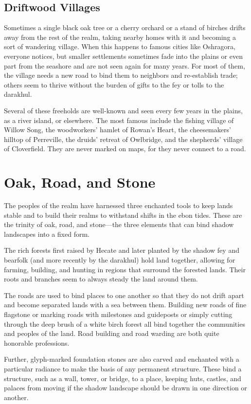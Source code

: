 \documentclass[10pt,a4paper,twoside,bg=print,twocolumn,openany,nodeprecatedcode]{dndbook}
\begin{document}
\subsection{Driftwood Villages}
Sometimes a single black oak tree or a cherry orchard or a stand of birches drifts away from the rest of the realm, taking nearby homes with it and becoming a sort of wandering village. When this happens to famous cities like Oshragora, everyone notices, but smaller settlements sometimes fade into the plains or even part from the seashore and are not seen again for many years. For most of them, the village needs a new road to bind them to neighbors and re-establish trade; others seem to thrive without the burden of gifts to the fey or tolls to the darakhul.

Several of these freeholds are well-known and seen every few years in the plains, as a river island, or elsewhere. The most famous include the fishing village of Willow Song, the woodworkers' hamlet of Rowan's Heart, the cheesemakers' hilltop of Perreville, the druids' retreat of Owlbridge, and the shepherds' village of Cloverfield. They are never marked on maps, for they never connect to a road.

\section{Oak, Road, and Stone}
The peoples of the realm have harnessed three enchanted tools to keep lands stable and to build their realms to withstand shifts in the ebon tides. These are the trinity of oak, road, and stone—the three elements that can bind shadow landscapes into a fixed form.

The rich forests first raised by Hecate and later planted by the shadow fey and bearfolk (and more recently by the darakhul) hold land together, allowing for farming, building, and hunting in regions that surround the forested lands. Their roots and branches seem to always steady the land around them.

The roads are used to bind places to one another so that they do not drift apart and become separated lands with a sea between them. Building new roads of fine flagstone or marking roads with milestones and guideposts or simply cutting through the deep brush of a white birch forest all bind together the communities and peoples of the land. Road building and road warding are both quite honorable professions.

Further, glyph-marked foundation stones are also carved and enchanted with a particular radiance to make the basis of any permanent structure. These bind a structure, such as a wall, tower, or bridge, to a place, keeping huts, castles, and palaces from moving if the shadow landscape should be drawn in one direction or another.
\end{document}
